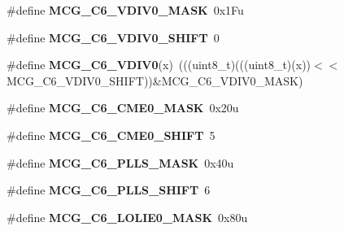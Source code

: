 \begin{DoxyCompactItemize}
\item 
\#define {\bfseries M\+C\+G\+\_\+\+C6\+\_\+\+V\+D\+I\+V0\+\_\+\+M\+A\+SK}~0x1\+Fu\hypertarget{group__MCG__Register__Masks_gacf93ac207865bd372d9148f10dce7267}{}\label{group__MCG__Register__Masks_gacf93ac207865bd372d9148f10dce7267}

\item 
\#define {\bfseries M\+C\+G\+\_\+\+C6\+\_\+\+V\+D\+I\+V0\+\_\+\+S\+H\+I\+FT}~0\hypertarget{group__MCG__Register__Masks_ga92208f56fc7ce68a0a8ff14ab5c3b2f6}{}\label{group__MCG__Register__Masks_ga92208f56fc7ce68a0a8ff14ab5c3b2f6}

\item 
\#define {\bfseries M\+C\+G\+\_\+\+C6\+\_\+\+V\+D\+I\+V0}(x)~(((uint8\+\_\+t)(((uint8\+\_\+t)(x))$<$$<$M\+C\+G\+\_\+\+C6\+\_\+\+V\+D\+I\+V0\+\_\+\+S\+H\+I\+FT))\&M\+C\+G\+\_\+\+C6\+\_\+\+V\+D\+I\+V0\+\_\+\+M\+A\+SK)\hypertarget{group__MCG__Register__Masks_ga50b2068270153c3013b4e0ac2256fbfd}{}\label{group__MCG__Register__Masks_ga50b2068270153c3013b4e0ac2256fbfd}

\item 
\#define {\bfseries M\+C\+G\+\_\+\+C6\+\_\+\+C\+M\+E0\+\_\+\+M\+A\+SK}~0x20u\hypertarget{group__MCG__Register__Masks_ga2e0daa102ec3f225ed9297f7bc9f8239}{}\label{group__MCG__Register__Masks_ga2e0daa102ec3f225ed9297f7bc9f8239}

\item 
\#define {\bfseries M\+C\+G\+\_\+\+C6\+\_\+\+C\+M\+E0\+\_\+\+S\+H\+I\+FT}~5\hypertarget{group__MCG__Register__Masks_ga096e62e71f69f5b749999d671d800090}{}\label{group__MCG__Register__Masks_ga096e62e71f69f5b749999d671d800090}

\item 
\#define {\bfseries M\+C\+G\+\_\+\+C6\+\_\+\+P\+L\+L\+S\+\_\+\+M\+A\+SK}~0x40u\hypertarget{group__MCG__Register__Masks_ga66a1dfdde86a9c165d7bdec17c77578f}{}\label{group__MCG__Register__Masks_ga66a1dfdde86a9c165d7bdec17c77578f}

\item 
\#define {\bfseries M\+C\+G\+\_\+\+C6\+\_\+\+P\+L\+L\+S\+\_\+\+S\+H\+I\+FT}~6\hypertarget{group__MCG__Register__Masks_ga690a1869788f450cfa53d73f983a1c05}{}\label{group__MCG__Register__Masks_ga690a1869788f450cfa53d73f983a1c05}

\item 
\#define {\bfseries M\+C\+G\+\_\+\+C6\+\_\+\+L\+O\+L\+I\+E0\+\_\+\+M\+A\+SK}~0x80u\hypertarget{group__MCG__Register__Masks_ga0b0e7ca112d81e86d413c014d144fd8d}{}\label{group__MCG__Register__Masks_ga0b0e7ca112d81e86d413c014d144fd8d}


\end{DoxyCompactItemize}
